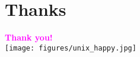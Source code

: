 \documentclass[xcolor={dvipsnames}]{beamer}
\begin{document}
\section*{Thanks}

\begin{frame}
    \vspace*{1cm}
    \begin{center}
      {\Huge \bf \textcolor{Magenta}{Thank you!}} \\
      \bigskip
      \bigskip
      \texttt{[image: figures/unix\_happy.jpg]}
    \end{center}
\end{frame}

\begin{frame}%
  \frametitle{\bibname}
  \printbibliography
\end{frame}

%
\end{document}
